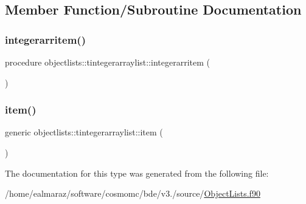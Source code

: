 \subsection{Member Function/\+Subroutine Documentation}
\mbox{\label{structobjectlists_1_1tintegerarraylist_aa20cd53ae8df2065aa764861d0d3060a}} 
\subsubsection{\texorpdfstring{integerarritem()}{integerarritem()}}
{\footnotesize\ttfamily procedure objectlists\+::tintegerarraylist\+::integerarritem (\begin{DoxyParamCaption}{ }\end{DoxyParamCaption})\hspace{0.3cm}{\ttfamily [private]}}

\mbox{\label{structobjectlists_1_1tintegerarraylist_a717d0468f7abb94ff960917c5e5d9a2d}} 
\subsubsection{\texorpdfstring{item()}{item()}}
{\footnotesize\ttfamily generic objectlists\+::tintegerarraylist\+::item (\begin{DoxyParamCaption}{ }\end{DoxyParamCaption})\hspace{0.3cm}{\ttfamily [private]}}



The documentation for this type was generated from the following file\+:\begin{DoxyCompactItemize}
\item 
/home/ealmaraz/software/cosmomc/bde/v3./source/\mbox{\hyperlink{ObjectLists_8f90}{Object\+Lists.\+f90}}\end{DoxyCompactItemize}
